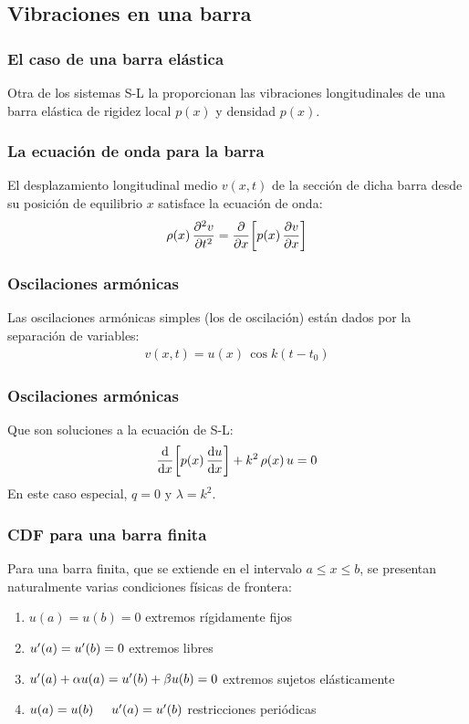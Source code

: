 \documentclass[12pt]{beamer}
\begin{document}
\subsection{Vibraciones en una barra}

\begin{frame}
\frametitle{El caso de una barra elástica}
Otra  de los sistemas S-L la proporcionan \textcolor{ao(english)}{las vibraciones longitudinales de una barra elástica} de rigidez local $p (x)$ y densidad $p (x)$.
\end{frame}
\begin{frame}
\frametitle{La ecuación de onda para la barra}
El desplazamiento longitudinal medio $v (x, t)$ de la sección de dicha barra desde su posición de equilibrio $x$ satisface la ecuación de onda:
\pause
\begin{align*}
\rho (x) \, \pdv[2]{v}{t} = \pdv{x} \bigg[ p (x) \, \pdv{v}{x} \bigg]
\end{align*}
\end{frame}
\begin{frame}
\frametitle{Oscilaciones armónicas}
Las oscilaciones armónicas simples (los  de oscilación) están dados por la separación de variables:
\pause
\begin{align*}
v (x, t) = u (x) \, \cos k(t - t_{0})
\end{align*}
\end{frame}
\begin{frame}
\frametitle{Oscilaciones armónicas}
Que son soluciones a la ecuación de S-L:
\pause
\begin{align*}
\dv{x} \bigg[ p (x) \, \dv{u}{x} \bigg] + k^{2} \, \rho (x) \, u = 0
\end{align*}
En este caso especial, $q = 0$ y $\lambda = k^{2}$.
\end{frame}
\begin{frame}
\frametitle{CDF para una barra finita}
Para una barra finita, que se extiende en el intervalo $a \leq x \leq b$, se presentan naturalmente varias condiciones físicas de frontera:
\pause
{}
\begin{enumerate}[<+->]
\item $u (a) = u (b) = 0$ extremos rígidamente fijos
\item ${u}^{\prime} (a) = {u}^{\prime} (b) = 0$ extremos libres
\item ${u}^{\prime} (a) + \alpha u (a) = {u}^{\prime} (b) + \beta u (b) = 0$ extremos sujetos elásticamente
\item $u (a) = u (b) \hspace{0.5cm} {u}^{\prime} (a) = {u}^{\prime} (b)$ restricciones periódicas
\end{enumerate}
\end{frame}
\end{document}
